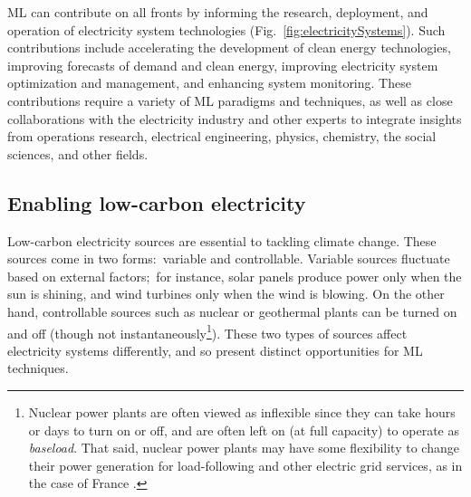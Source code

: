 \documentclass[11pt]{report}
\begin{document}
ML can contribute on all fronts by informing the research, deployment, and operation of electricity system technologies (Fig.~\ref{fig:electricitySystems}). Such contributions include accelerating the development of clean energy technologies, improving forecasts of demand and clean energy, improving electricity system optimization and management, and enhancing system monitoring. These contributions require a variety of ML paradigms and techniques, as well as close collaborations with the electricity industry and other experts to integrate insights from operations research, electrical engineering, physics, chemistry, the social sciences, and other fields.


\subsection{Enabling low-carbon electricity}
\label{sec:electricity-lowCarbon}
Low-carbon electricity sources are essential to tackling climate change. These sources come in two forms:~variable and controllable. Variable sources fluctuate based on external factors;~for instance, solar panels produce power only when the sun is shining, and wind turbines only when the wind is blowing. On the other hand, controllable sources such as nuclear or geothermal plants can be turned on and off (though not instantaneously\footnote{Nuclear power plants are often viewed as inflexible since they can take hours or days to turn on or off, and are often left on (at full capacity) to operate as \emph{baseload}. That said, nuclear power plants may have some flexibility to change their power generation for load-following and other electric grid services, as in the case of France \cite{lokhov2011technical}.}). These two types of sources affect electricity systems differently, and so present distinct opportunities for ML techniques.
\end{document}
